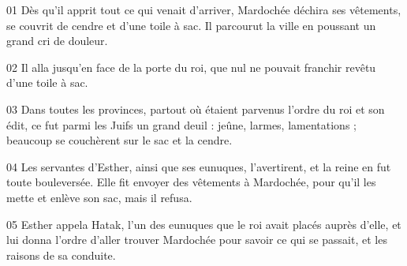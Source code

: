 01 Dès qu’il apprit tout ce qui venait d’arriver, Mardochée déchira ses vêtements, se couvrit de cendre et d’une toile à sac. Il parcourut la ville en poussant un grand cri de douleur.

02 Il alla jusqu’en face de la porte du roi, que nul ne pouvait franchir revêtu d’une toile à sac.

03 Dans toutes les provinces, partout où étaient parvenus l’ordre du roi et son édit, ce fut parmi les Juifs un grand deuil : jeûne, larmes, lamentations ; beaucoup se couchèrent sur le sac et la cendre.

04 Les servantes d’Esther, ainsi que ses eunuques, l’avertirent, et la reine en fut toute bouleversée. Elle fit envoyer des vêtements à Mardochée, pour qu’il les mette et enlève son sac, mais il refusa.

05 Esther appela Hatak, l’un des eunuques que le roi avait placés auprès d’elle, et lui donna l’ordre d’aller trouver Mardochée pour savoir ce qui se passait, et les raisons de sa conduite.
